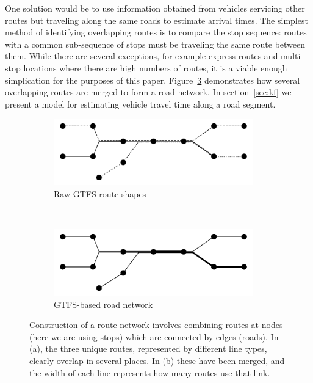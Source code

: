 One solution would be to use information obtained from
vehicles servicing other routes but traveling along the same roads
to estimate arrival times.
The simplest method of identifying overlapping routes is to compare
the stop sequence: 
routes with a common sub-sequence of stops must be traveling the same route between them.
While there are several exceptions, for example express routes 
and multi-stop locations where there are high numbers of routes,
it is a viable enough simplication for the purposes of this paper.
Figure~\ref{fig:network_creation} demonstrates how several overlapping routes 
are merged to form a road network.
In section~\ref{sec:kf} we present a model for estimating vehicle travel time
along a road segment.

\begin{figure}[tb]
    \centering
    \begin{subfigure}{0.7\textwidth}
        \centering
        \includegraphics[width=0.95\textwidth]{figures/02_network_segments_1.pdf}
        \caption{Raw GTFS route shapes}
        \label{fig:network_creation_1}
    \end{subfigure} \\
    \begin{subfigure}{0.7\textwidth}
        \centering
        \includegraphics[width=0.95\textwidth]{figures/02_network_segments_2.pdf}
        \caption{GTFS-based road network}
        \label{fig:network_creation_2}
    \end{subfigure}
    \caption{Construction of a route network involves combining routes at nodes %
        (here we are using stops) which are connected by edges (roads). %
        In (a), the three unique routes, represented by different line types, clearly %
        overlap in several places. In (b) these have been merged, and the width of each line %
        represents how many routes use that link.}
    \label{fig:network_creation}
\end{figure}


